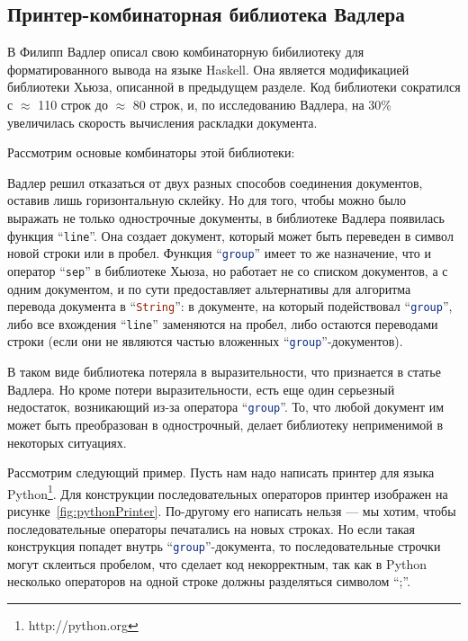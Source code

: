 \newpage

\subsection{Принтер-комбинаторная библиотека Вадлера}

В \cite{wadler} Филипп Вадлер описал свою комбинаторную бибилиотеку для форматированного вывода на языке Haskell. Она является модификацией библиотеки Хьюза, описанной в предыдущем разделе. Код библиотеки сократился с $\approx$ 110 строк до $\approx$ 80 строк, и, по исследованию Вадлера, на 30\% увеличилась скорость вычисления раскладки документа.

Рассмотрим основые комбинаторы этой библиотеки:


Вадлер решил отказаться от двух разных способов соединения документов, оставив лишь горизонтальную склейку. Но для того, чтобы можно было выражать не только однострочные документы, в библиотеке Вадлера появилась функция “\lstinline[language=Haskell]{line}”. Она создает документ, который может быть переведен в символ новой строки или в пробел.
Функция “\lstinline[language=Haskell]{group}” имеет то же назначение, что и оператор “\lstinline[language=Haskell]{sep}” в библиотеке Хьюза, но работает не со списком документов, а с одним документом, и по сути предоставляет альтернативы для алгоритма перевода документа в “\lstinline[language=Haskell]{String}”: в документе, на который подействовал “\lstinline[language=Haskell]{group}”, либо все вхождения “\lstinline[language=Haskell]{line}” заменяются на пробел, либо остаются переводами строки (если они не являются частью вложенных “\lstinline[language=Haskell]{group}”-документов).

В таком виде библиотека потеряла в выразительности, что признается в статье Вадлера. Но кроме потери выразительности, есть еще один серьезный недостаток, возникающий из-за оператора “\lstinline[language=Haskell]{group}”. То, что любой документ им может быть преобразован в однострочный, делает библиотеку неприменимой в некоторых ситуациях. 

Рассмотрим следующий пример. Пусть нам надо написать принтер для языка Python\footnote{http://python.org}. Для конструкции последовательных операторов принтер изображен на рисунке~\ref{fig:pythonPrinter}.
По-другому его написать нельзя --- мы хотим, чтобы последовательные операторы печатались на новых строках. Но если такая конструкция попадет внутрь “\lstinline[language=Haskell]{group}”-документа, то последовательные строчки могут склеиться пробелом, что сделает код некорректным, так как в Python несколько операторов на одной строке должны разделяться символом “;”.

